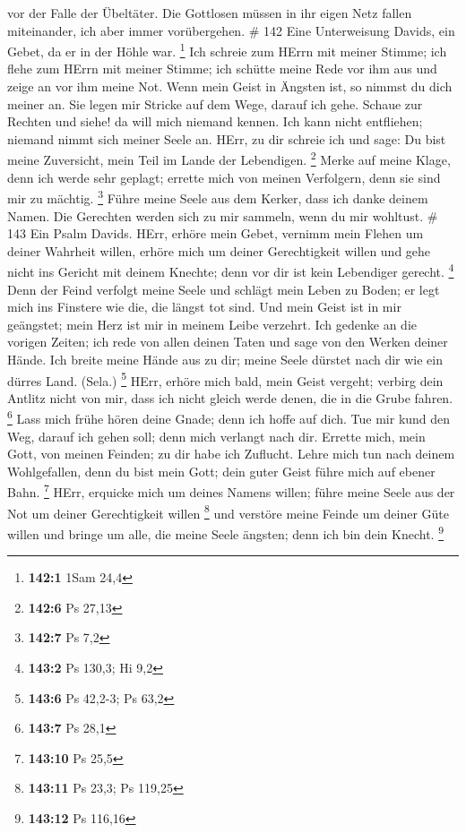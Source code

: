 vor der Falle der Übeltäter.  Die Gottlosen müssen in ihr
eigen Netz fallen miteinander, ich aber immer vorübergehen. \# 142
 Eine Unterweisung Davids, ein Gebet, da er in der Höhle
war. \footnote{\textbf{142:1} 1Sam 24,4}  Ich schreie zum
HErrn mit meiner Stimme; ich flehe zum HErrn mit meiner Stimme;
 ich schütte meine Rede vor ihm aus und zeige an vor ihm
meine Not.  Wenn mein Geist in Ängsten ist, so nimmst du
dich meiner an. Sie legen mir Stricke auf dem Wege, darauf ich gehe.
 Schaue zur Rechten und siehe! da will mich niemand kennen.
Ich kann nicht entfliehen; niemand nimmt sich meiner Seele an.
 HErr, zu dir schreie ich und sage: Du bist meine
Zuversicht, mein Teil im Lande der Lebendigen. \footnote{\textbf{142:6}
  Ps 27,13}  Merke auf meine Klage, denn ich werde sehr
geplagt; errette mich von meinen Verfolgern, denn sie sind mir zu
mächtig. \footnote{\textbf{142:7} Ps 7,2}  Führe meine Seele
aus dem Kerker, dass ich danke deinem Namen. Die Gerechten werden sich
zu mir sammeln, wenn du mir wohltust. \# 143  Ein Psalm
Davids. HErr, erhöre mein Gebet, vernimm mein Flehen um deiner Wahrheit
willen, erhöre mich um deiner Gerechtigkeit willen  und gehe
nicht ins Gericht mit deinem Knechte; denn vor dir ist kein Lebendiger
gerecht. \footnote{\textbf{143:2} Ps 130,3; Hi 9,2}  Denn
der Feind verfolgt meine Seele und schlägt mein Leben zu Boden; er legt
mich ins Finstere wie die, die längst tot sind.  Und mein
Geist ist in mir geängstet; mein Herz ist mir in meinem Leibe verzehrt.
 Ich gedenke an die vorigen Zeiten; ich rede von allen
deinen Taten und sage von den Werken deiner Hände.  Ich
breite meine Hände aus zu dir; meine Seele dürstet nach dir wie ein
dürres Land. (Sela.) \footnote{\textbf{143:6} Ps 42,2-3; Ps 63,2}
 HErr, erhöre mich bald, mein Geist vergeht; verbirg dein
Antlitz nicht von mir, dass ich nicht gleich werde denen, die in die
Grube fahren. \footnote{\textbf{143:7} Ps 28,1}  Lass mich
frühe hören deine Gnade; denn ich hoffe auf dich. Tue mir kund den Weg,
darauf ich gehen soll; denn mich verlangt nach dir.  Errette
mich, mein Gott, von meinen Feinden; zu dir habe ich Zuflucht.
 Lehre mich tun nach deinem Wohlgefallen, denn du bist mein
Gott; dein guter Geist führe mich auf ebener Bahn. \footnote{\textbf{143:10}
  Ps 25,5}  HErr, erquicke mich um deines Namens willen;
führe meine Seele aus der Not um deiner Gerechtigkeit willen \footnote{\textbf{143:11}
  Ps 23,3; Ps 119,25}  und verstöre meine Feinde um deiner
Güte willen und bringe um alle, die meine Seele ängsten; denn ich bin
dein Knecht. \footnote{\textbf{143:12} Ps 116,16}

